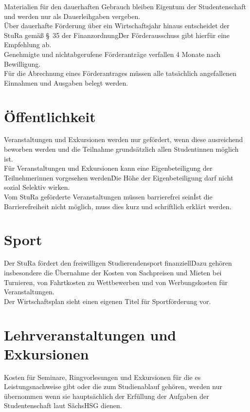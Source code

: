 \begin{multicols}{2}
\Abs \Satz Materialien für den dauerhaften Gebrauch bleiben Eigentum der Studentenschaft
und werden nur als Dauerleihgaben vergeben.\\

\Abs \Satz Über dauerhafte Förderung über ein Wirtschaftsjahr hinaus entscheidet der StuRa gemäß
§~35 der Finanzordnung\. Der Förderausschuss gibt hierfür eine Empfehlung ab.\\

\Abs \Satz Genehmigte und nichtabgerufene Förderanträge verfallen 4 Monate nach Bewilligung.\\

\Abs \Satz Für die Abrechnung eines Förderantrages müssen alle tatsächlich angefallenen Einnahmen
und Ausgaben belegt werden.\\


\section{Öffentlichkeit}
\Abs \Satz Veranstaltungen und Exkursionen werden nur gefördert, wenn diese ausreichend beworben
werden und die Teilnahme grundsätzlich allen Studentinnen möglich ist.\\

\Abs \Satz Für Veranstaltungen und Exkursionen kann eine Eigenbeteiligung der Teilnehmerinnen
vorgesehen werden\. Die Höhe der Eigenbeteiligung darf nicht sozial Selektiv wirken.\\

\Abs \Satz Vom StuRa geförderte Veranstaltungen müssen barrierefrei sein\. Ist die Barrierefreiheit
nicht möglich, muss dies kurz und schriftlich erklärt werden.

\section{Sport}
\Abs \Satz Der StuRa fördert den freiwilligen Studierendensport finanziell\. Dazu gehören insbesondere
die Übernahme der Kosten von Sachpreisen und Mieten bei Turnieren, von Fahrtkosten zu Wettbewerben und von Werbungskosten für Veranstaltungen.\\

\Abs \Satz Der Wirtschaftsplan sieht einen eigenen Titel für Sportförderung vor.

\section{Lehrveranstaltungen und Exkursionen}
\Abs \Satz Kosten für Seminare, Ringvorlesungen und Exkursionen für die es Leistungsnachweise gibt
oder die zum Studienablauf gehören, werden nur übernommen wenn sie hauptsächlich der
Erfüllung der Aufgaben der Studentenschaft laut SächsHSG dienen.


\end{multicols}
